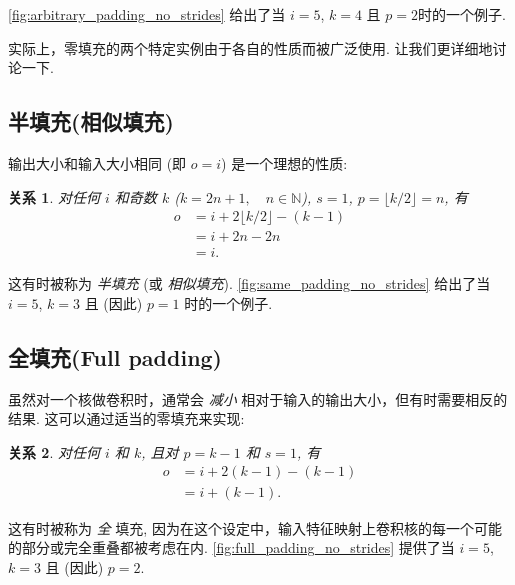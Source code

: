 \documentclass[notitlepage]{ctexrep}
\newtheorem{relationship}{关系}
\begin{document}
\noindent \autoref{fig:arbitrary_padding_no_strides} 给出了当 $i
= 5$, $k = 4$ 且 $p = 2$时的一个例子.

实际上，零填充的两个特定实例由于各自的性质而被广泛使用. 让我们更详细地讨论一下.

\subsection{半填充(相似填充)}

输出大小和输入大小相同 (即 $o = i$) 是一个理想的性质:

\begin{relationship}\label{rel:same_padding_no_strides}
对任何 $i$ 和奇数 $k$ ($k = 2n + 1, \quad n \in \mathbb{N}$), $s = 1$, $p = \lfloor k / 2 \rfloor = n$, 有
\begin{equation*}
\begin{split}
    o &= i + 2 \lfloor k / 2 \rfloor - (k - 1) \\
      &= i + 2n - 2n \\
      &= i.
\end{split}
\end{equation*}
\end{relationship}

\noindent 这有时被称为 {\em 半填充\/} (或 {\em 相似填充\/}). \autoref{fig:same_padding_no_strides} 给出了当
$i = 5$, $k = 3$ 且 (因此) $p = 1$ 时的一个例子.

\subsection{全填充(Full padding)}

虽然对一个核做卷积时，通常会 {\em 减小\/} 相对于输入的输出大小，但有时需要相反的结果. 这可以通过适当的零填充来实现:

\begin{relationship}\label{rel:full_padding_no_strides}
对任何 $i$ 和 $k$, 且对 $p = k - 1$ 和 $s = 1$, 有
\begin{equation*}
\begin{split}
    o &= i + 2(k - 1) - (k - 1) \\
      &= i + (k - 1).
\end{split}
\end{equation*}
\end{relationship}

\noindent 这有时被称为 {\em 全\/} 填充, 因为在这个设定中，输入特征映射上卷积核的每一个可能的部分或完全重叠都被考虑在内. \autoref{fig:full_padding_no_strides}
提供了当 $i = 5$, $k = 3$ 且 (因此) $p = 2$.
\end{document}
